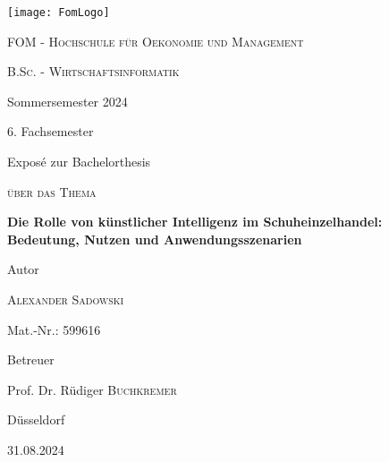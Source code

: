 
\begin{titlepage}
	
	\centering
	\texttt{[image: FomLogo]}\par\vspace{1cm}
	{\scshape\LARGE FOM - Hochschule für Oekonomie und Management \par}
	\vspace{1cm}
	{\scshape B.Sc. - Wirtschaftsinformatik\par Sommersemester 2024\par 6. Fachsemester\par Exposé zur Bachelorthesis\par}
	\vspace{1cm}
	{\scshape über das Thema\par}
	\vspace{1cm}
	{\large\bfseries Die Rolle von künstlicher Intelligenz im Schuheinzelhandel: Bedeutung, Nutzen und Anwendungsszenarien\par}
	\vspace{1.5cm}
	Autor\par
	{\large\textsc{Alexander Sadowski}\par}
	Mat.-Nr.: 599616\par
	\vfill
	Betreuer\par
	Prof. Dr. Rüdiger \textsc{Buchkremer}
	
	\vfill
	
	{Düsseldorf\par 31.08.2024\par}
\end{titlepage}